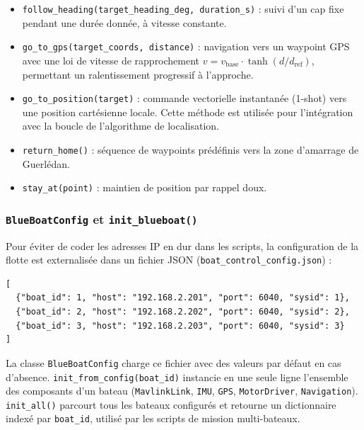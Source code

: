 \begin{itemize}
  \item \texttt{follow\_heading(target\_heading\_deg, duration\_s)} : suivi d'un cap fixe pendant une durée donnée, à vitesse constante.
  \item \texttt{go\_to\_gps(target\_coords, distance)} : navigation vers un waypoint GPS avec une loi de vitesse de rapprochement $v = v_{\text{base}} \cdot \tanh(d / d_{\text{ref}})$, permettant un ralentissement progressif à l'approche.
  \item \texttt{go\_to\_position(target)} : commande vectorielle instantanée (1-shot) vers une position cartésienne locale. Cette méthode est utilisée pour l'intégration avec la boucle de l'algorithme de localisation.
  \item \texttt{return\_home()} : séquence de waypoints prédéfinis vers la zone d'amarrage de Guerlédan.
  \item \texttt{stay\_at(point)} : maintien de position par rappel doux.
\end{itemize}

\subsubsection{\texttt{BlueBoatConfig} et \texttt{init\_blueboat()}}

Pour éviter de coder les adresses IP en dur dans les scripts, la configuration de la flotte est externalisée dans un fichier JSON (\texttt{boat\_control\_config.json}) :

\begin{lstlisting}[style=python, caption={Exemple de fichier de configuration de la flotte (\texttt{boat\_control\_config.json}).}]
[
  {"boat_id": 1, "host": "192.168.2.201", "port": 6040, "sysid": 1},
  {"boat_id": 2, "host": "192.168.2.202", "port": 6040, "sysid": 2},
  {"boat_id": 3, "host": "192.168.2.203", "port": 6040, "sysid": 3}
]
\end{lstlisting}

La classe \texttt{BlueBoatConfig} charge ce fichier avec des valeurs par défaut en cas d'absence. \texttt{init\_from\_config(boat\_id)} instancie en une seule ligne l'ensemble des composants d'un bateau (\texttt{MavlinkLink}, \texttt{IMU}, \texttt{GPS}, \texttt{MotorDriver}, \texttt{Navigation}). \texttt{init\_all()} parcourt tous les bateaux configurés et retourne un dictionnaire indexé par \texttt{boat\_id}, utilisé par les scripts de mission multi-bateaux.

